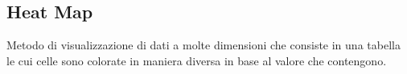 \documentclass[../glossario.tex]{subfiles}
\begin{document}
\subsection*{Heat Map}
Metodo di visualizzazione di dati a molte dimensioni che consiste in una tabella le cui celle sono colorate in maniera diversa in base al valore che contengono.

    
\end{document}
